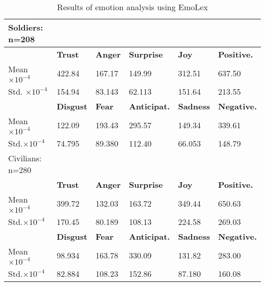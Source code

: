 \begin{table}[h]
  \caption{Results of emotion analysis using EmoLex}
  \label{table:emolexResult}
  \centering
  \renewcommand{\tabularxcolumn}{m} %
  \begin{tabularx}{\textwidth}{l l l l l l}
    \toprule
    Soldiers: n=208
    \tabularnewline \midrule
     & \textbf{Trust}   & \textbf{Anger} & \textbf{Surprise}   & \textbf{Joy}     & \textbf{Positive.}
    \tabularnewline \midrule
    Mean $\times 10^{-4}$
     & 422.84           & 167.17         & 149.99              & 312.51           & 637.50
    \tabularnewline
    Std. $\times 10^{-4}$
     & 154.94           & 83.143         & 62.113              & 151.64           & 213.55
    \tabularnewline \midrule
     & \textbf{Disgust} & \textbf{Fear}  & \textbf{Anticipat.} & \textbf{Sadness} & \textbf{Negative.}
    \tabularnewline \midrule
    Mean$\times 10^{-4}$
     & 122.09           & 193.43         & 295.57              & 149.34           & 339.61
    \tabularnewline
    Std.$\times 10^{-4}$
     & 74.795           & 89.380         & 112.40              & 66.053           & 148.79
    \tabularnewline \hline \hline
    Civilians: n=280
    \tabularnewline \midrule
     & \textbf{Trust}   & \textbf{Anger} & \textbf{Surprise}   & \textbf{Joy}     & \textbf{Positive.}
    \tabularnewline \midrule
    Mean $\times 10^{-4}$
     & 399.72           & 132.03         & 163.72              & 349.44           & 650.63
    \tabularnewline
    Std.$\times 10^{-4}$
     & 170.45           & 80.189         & 108.13              & 224.58           & 269.03
    \tabularnewline \midrule
     & \textbf{Disgust} & \textbf{Fear}  & \textbf{Anticipat.} & \textbf{Sadness} & \textbf{Negative.}
    \tabularnewline \midrule
    Mean$\times 10^{-4}$
     & 98.934           & 163.78         & 330.09              & 131.82           & 283.00
    \tabularnewline
    Std.$\times 10^{-4}$
     & 82.884           & 108.23         & 152.86              & 87.180           & 160.08
    \tabularnewline \bottomrule
  \end{tabularx}
\end{table}
